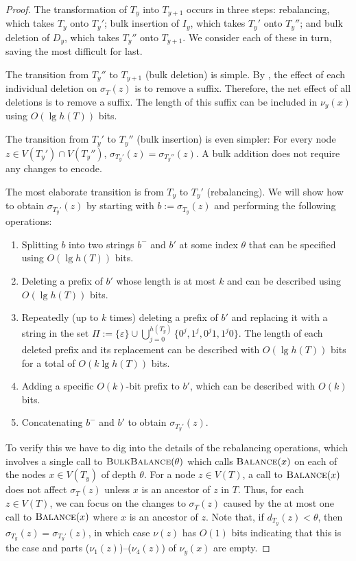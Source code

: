 \documentclass[kpfonts]{patmorin}
\begin{document}
\begin{proof}
  The transformation of $T_{y}$ into $T_{y+1}$ occurs in three steps: rebalancing, which takes $T_y$ onto $T_y'$; bulk insertion of $I_y$, which takes $T_y'$ onto $T_y''$; and bulk deletion of $D_y$, which takes $T_y''$ onto $T_{y+1}$.  We consider each of these in turn, saving the most difficult for last.
  
  The transition from $T_y''$ to $T_{y+1}$ (bulk deletion) is simple.  By , the effect of each individual deletion on $\sigma_T(z)$ is to remove a suffix.  Therefore, the net effect of all deletions is to remove a suffix.  The length of this suffix can be included in $\nu_y(x)$ using $O(\lg h(T))$ bits.
  
  The transition from $T_y'$ to $T_y''$ (bulk insertion) is even simpler: For every node $z\in V(T_y')\cap V(T_y'')$, $\sigma_{T_y'}(z)=\sigma_{T_y''}(z)$.  A bulk addition does not require any changes to encode.
  
  The most elaborate transition is from $T_y$ to $T_y'$ (rebalancing).  We will show how to obtain $\sigma_{T_y'}(z)$ by starting with $b:=\sigma_{T_y}(z)$ and performing the following operations:
  \begin{enumerate}[($\nu_1$)]
    \item Splitting $b$ into two strings $b^-$ and $b'$ at some index $\theta$ that can be specified using $O(\lg h(T))$ bits.
    \item Deleting a prefix of $b'$ whose length is at most $k$ and can be described using $O(\lg h(T))$ bits.
    \item Repeatedly (up to $k$ times) deleting a prefix of $b'$ and replacing it with a string in the set $\Pi:=\{\varepsilon\}\cup\bigcup_{j=0}^{h(T_y)}\{0^j, 1^j, 0^j1, 1^j0\}$. The length of each deleted prefix and its replacement can be described with $O(\lg h(T))$ bits for a total of $O(k\lg h(T))$ bits.
    \item Adding a specific $O(k)$-bit prefix to $b'$, which can be described with $O(k)$ bits.
    \item Concatenating $b^-$ and $b'$ to obtain $\sigma_{T_y'}(z)$.
  \end{enumerate}
  To verify this we have to dig into the details of the rebalancing operations, which involves a single call to $\textsc{BulkBalance}(\theta)$ which calls $\textsc{Balance}(x)$ on each of the nodes $x\in V(T_y)$ of depth $\theta$.    
  For a node $z\in V(T)$, a call to $\textsc{Balance}(x)$ does not affect $\sigma_T(z)$ unless $x$ is an ancestor of $z$ in $T$.  Thus, for each $z\in V(T)$, we can focus on the changes to $\sigma_T(z)$ caused by the at most one call to $\textsc{Balance}(x)$ where $x$ is an ancestor of $z$. Note that, if $d_{T_y}(z)<\theta$, then $\sigma_{T_y}(z)=\sigma_{T_y'}(z)$, in which case $\nu(z)$ has $O(1)$ bits indicating that this is the case and parts ($\nu_1(z)$)--($\nu_4(z)$) of $\nu_y(x)$ are empty.
  

\end{proof}
\end{document}
